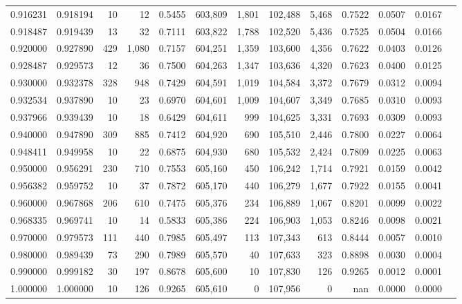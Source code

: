\begin{tabular}{rrrrrrrrrrrrr}
0.916231 & 0.918194 &     10 &    12 &                                     0.5455 & 603,809 &   1,801 & 102,488 &   5,468 & 0.7522 & 0.0507 & 0.0167 \\
0.918487 & 0.919439 &     13 &    32 &                                     0.7111 & 603,822 &   1,788 & 102,520 &   5,436 & 0.7525 & 0.0504 & 0.0166 \\
0.920000 & 0.927890 &    429 & 1,080 &                                     0.7157 & 604,251 &   1,359 & 103,600 &   4,356 & 0.7622 & 0.0403 & 0.0126 \\
0.928487 & 0.929573 &     12 &    36 &                                     0.7500 & 604,263 &   1,347 & 103,636 &   4,320 & 0.7623 & 0.0400 & 0.0125 \\
0.930000 & 0.932378 &    328 &   948 &                                     0.7429 & 604,591 &   1,019 & 104,584 &   3,372 & 0.7679 & 0.0312 & 0.0094 \\
0.932534 & 0.937890 &     10 &    23 &                                     0.6970 & 604,601 &   1,009 & 104,607 &   3,349 & 0.7685 & 0.0310 & 0.0093 \\
0.937966 & 0.939439 &     10 &    18 &                                     0.6429 & 604,611 &     999 & 104,625 &   3,331 & 0.7693 & 0.0309 & 0.0093 \\
0.940000 & 0.947890 &    309 &   885 &                                     0.7412 & 604,920 &     690 & 105,510 &   2,446 & 0.7800 & 0.0227 & 0.0064 \\
0.948411 & 0.949958 &     10 &    22 &                                     0.6875 & 604,930 &     680 & 105,532 &   2,424 & 0.7809 & 0.0225 & 0.0063 \\
0.950000 & 0.956291 &    230 &   710 &                                     0.7553 & 605,160 &     450 & 106,242 &   1,714 & 0.7921 & 0.0159 & 0.0042 \\
0.956382 & 0.959752 &     10 &    37 &                                     0.7872 & 605,170 &     440 & 106,279 &   1,677 & 0.7922 & 0.0155 & 0.0041 \\
0.960000 & 0.967868 &    206 &   610 &                                     0.7475 & 605,376 &     234 & 106,889 &   1,067 & 0.8201 & 0.0099 & 0.0022 \\
0.968335 & 0.969741 &     10 &    14 &                                     0.5833 & 605,386 &     224 & 106,903 &   1,053 & 0.8246 & 0.0098 & 0.0021 \\
0.970000 & 0.979573 &    111 &   440 &                                     0.7985 & 605,497 &     113 & 107,343 &     613 & 0.8444 & 0.0057 & 0.0010 \\
0.980000 & 0.989439 &     73 &   290 &                                     0.7989 & 605,570 &      40 & 107,633 &     323 & 0.8898 & 0.0030 & 0.0004 \\
0.990000 & 0.999182 &     30 &   197 &                                     0.8678 & 605,600 &      10 & 107,830 &     126 & 0.9265 & 0.0012 & 0.0001 \\
1.000000 & 1.000000 &     10 &   126 &                                     0.9265 & 605,610 &       0 & 107,956 &       0 &    nan & 0.0000 & 0.0000 \\
\bottomrule
\end{tabular}
